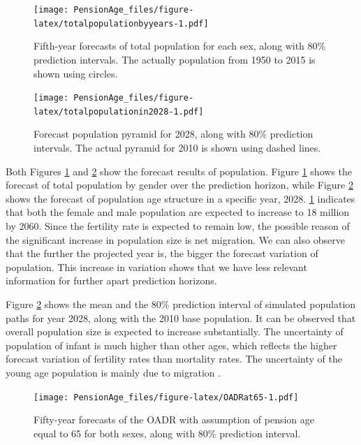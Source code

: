 \documentclass[11pt,a4paper,]{article}
\begin{document}
\begin{figure}
\centering
\texttt{[image: PensionAge\_files/figure-latex/totalpopulationbyyears-1.pdf]}
\caption{\label{fig:totalpopulationbyyears}Fifth-year forecasts of total
population for each sex, along with 80\% prediction intervals. The
actually population from 1950 to 2015 is shown using circles.}
\end{figure}

\begin{figure}
\centering
\texttt{[image: PensionAge\_files/figure-latex/totalpopulationin2028-1.pdf]}
\caption{\label{fig:totalpopulationin2028}Forecast population pyramid for
2028, along with 80\% prediction intervals. The actual pyramid for 2010
is shown using dashed lines.}
\end{figure}

Both Figures \ref{fig:totalpopulationbyyears} and
\ref{fig:totalpopulationin2028} show the forecast results of population.
Figure \ref{fig:totalpopulationbyyears} shows the forecast of total
population by gender over the prediction horizon, while Figure
\ref{fig:totalpopulationin2028} shows the forecast of population age
structure in a specific year, 2028. \ref{fig:totalpopulationbyyears}
indicates that both the female and male population are expected to
increase to 18 million by 2060. Since the fertility rate is expected to
remain low, the possible reason of the significant increase in
population size is net migration. We can also observe that the further
the projected year is, the bigger the forecast variation of population.
This increase in variation shows that we have less relevant information
for further apart prediction horizons.

Figure \ref{fig:totalpopulationin2028} shows the mean and the 80\%
prediction interval of simulated population paths for year 2028, along
with the 2010 base population. It can be observed that overall
population size is expected to increase substantially. The uncertainty
of population of infant is much higher than other ages, which reflects
the higher forecast variation of fertility rates than mortality rates.
The uncertainty of the young age population is mainly due to migration
\autocite{HB08}.

\begin{figure}
\centering
\texttt{[image: PensionAge\_files/figure-latex/OADRat65-1.pdf]}
\caption{\label{fig:OADRat65}Fifty-year forecasts of the OADR with
assumption of pension age equal to 65 for both sexes, along with 80\%
prediction interval.}
\end{figure}
\end{document}

